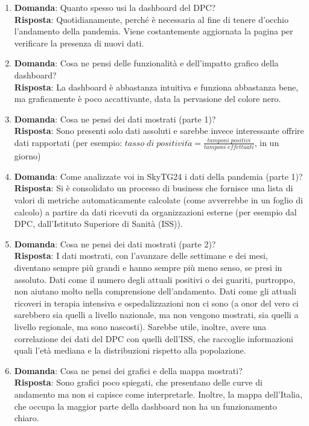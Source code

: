 \begin{enumerate}
    \item \textbf{Domanda}: Quanto spesso usi la dashboard del DPC?\\\textbf{Risposta}: Quotidianamente, perché è necessaria al fine di tenere d'occhio l'andamento della pandemia. Viene costantemente aggiornata la pagina per verificare la presenza di nuovi dati.
    \item \textbf{Domanda}: Cosa ne pensi delle funzionalità e dell’impatto grafico della dashboard?\\\textbf{Risposta}: La dashboard è abbastanza intuitiva e funziona abbastanza bene, ma graficamente è poco accattivante, data la pervasione del colore nero.
    \item \textbf{Domanda}: Cosa ne pensi dei dati mostrati (parte 1)?\\\textbf{Risposta}: Sono presenti solo dati assoluti e sarebbe invece interessante offrire dati rapportati (per esempio: $tasso\; di\; positivit\grave{a} = \frac{tamponi\; positivi}{tamponi\; effettuati}$, in un giorno)
    \item \textbf{Domanda}: Come analizzate voi in SkyTG24 i dati della pandemia (parte 1)?\\\textbf{Risposta}: Si è consolidato un processo di business che fornisce una lista di valori di metriche automaticamente calcolate (come avverrebbe in un foglio di calcolo) a partire da dati ricevuti da organizzazioni esterne (per esempio dal DPC, dall'Istituto Superiore di Sanità (ISS)).
    \item \textbf{Domanda}: Cosa ne pensi dei dati mostrati (parte 2)?\\\textbf{Risposta}: I dati mostrati, con l'avanzare delle settimane e dei mesi, diventano sempre più grandi e hanno sempre più meno senso, se presi in assoluto. Dati come il numero degli attuali positivi o dei guariti, purtroppo, non aiutano molto nella comprensione dell'andamento. Dati come gli attuali ricoveri in terapia intensiva e ospedalizzazioni non ci sono (a onor del vero ci sarebbero sia quelli a livello nazionale, ma non vengono mostrati, sia quelli a livello regionale, ma sono nascosti). Sarebbe utile, inoltre, avere una correlazione dei dati del DPC con quelli dell'ISS, che raccoglie informazioni quali l'età mediana e la distribuzioni rispetto alla popolazione.
    \item \textbf{Domanda}: Cosa ne pensi dei grafici e della mappa mostrati?\\\textbf{Risposta}: Sono grafici poco spiegati, che presentano delle curve di andamento ma non si capisce come interpretarle. Inoltre, la mappa dell'Italia, che occupa la maggior parte della dashboard non ha un funzionamento chiaro.

\end{enumerate}
